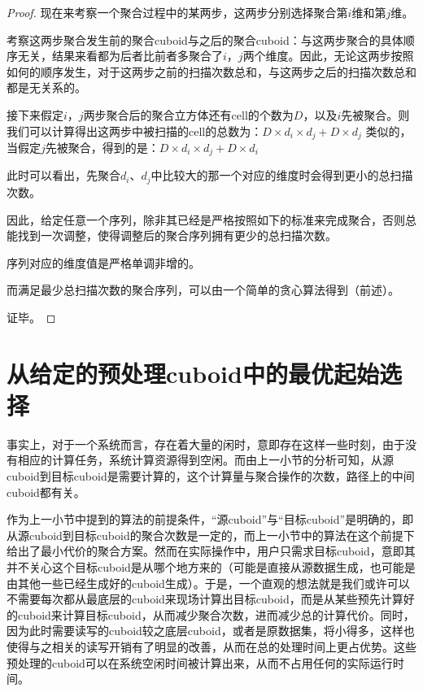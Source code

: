 \begin{proof}

现在来考察一个聚合过程中的某两步，这两步分别选择聚合第$i$维和第$j$维。

考察这两步聚合发生前的聚合cuboid与之后的聚合cuboid：与这两步聚合的具体顺序无关，结果来看都为后者比前者多聚合了$i$，$j$两个维度。因此，无论这两步按照如何的顺序发生，对于这两步之前的扫描次数总和，与这两步之后的扫描次数总和都是无关系的。

接下来假定$i$，$j$两步聚合后的聚合立方体还有cell的个数为$D$，以及$i$先被聚合。则我们可以计算得出这两步中被扫描的cell的总数为：$D \times d_i \times d_j + D \times d_j$ 
类似的，当假定$j$先被聚合，得到的是：$D \times d_i \times d_j + D \times d_i$

此时可以看出，先聚合$d_i$、$d_j$中比较大的那一个对应的维度时会得到更小的总扫描次数。

因此，给定任意一个序列，除非其已经是严格按照如下的标准来完成聚合，否则总能找到一次调整，使得调整后的聚合序列拥有更少的总扫描次数。

{\quad}序列对应的维度值是严格单调非增的。

而满足最少总扫描次数的聚合序列，可以由一个简单的贪心算法得到（前述）。

证毕。

\end{proof}

\section{从给定的预处理cuboid中的最优起始选择}
事实上，对于一个系统而言，存在着大量的闲时，意即存在这样一些时刻，由于没有相应的计算任务，系统计算资源得到空闲。而由上一小节的分析可知，从源cuboid到目标cuboid是需要计算的，这个计算量与聚合操作的次数，路径上的中间cuboid都有关。

作为上一小节中提到的算法的前提条件，“源cuboid”与“目标cuboid”是明确的，即从源cuboid到目标cuboid的聚合次数是一定的，而上一小节中的算法在这个前提下给出了最小代价的聚合方案。然而在实际操作中，用户只需求目标cuboid，意即其并不关心这个目标cuboid是从哪个地方来的（可能是直接从源数据生成，也可能是由其他一些已经生成好的cuboid生成）。于是，一个直观的想法就是我们或许可以不需要每次都从最底层的cuboid来现场计算出目标cuboid，而是从某些预先计算好的cuboid来计算目标cuboid，从而减少聚合次数，进而减少总的计算代价。同时，因为此时需要读写的cuboid较之底层cuboid，或者是原数据集，将小得多，这样也使得与之相关的读写开销有了明显的改善，从而在总的处理时间上更占优势。这些预处理的cuboid可以在系统空闲时间被计算出来，从而不占用任何的实际运行时间。

